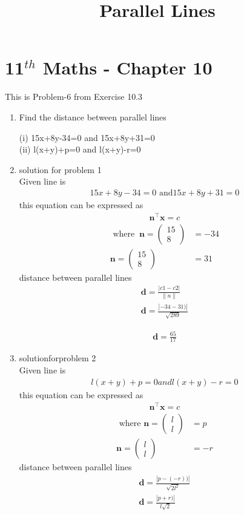 \documentclass[12pt]{article}
\providecommand{\norm}[1]{\left\lVert#1\right\rVert}
\newcommand{\myvec}[1]{\ensuremath{\begin{pmatrix}#1\end{pmatrix}}}
\let\vec\mathbf
\begin{document}
\begin{center}
\title{\textbf{Parallel Lines}}
\date{\vspace{-5ex}} %
\maketitle
\end{center}
\setcounter{page}{1}
\section*{11$^{th}$ Maths - Chapter 10}
This is Problem-6 from Exercise 10.3
\begin{enumerate}
	\item Find the distance between parallel lines 
	
(i) 15x+8y-34=0 and  15x+8y+31=0 \\
(ii) l(x+y)+p=0 and  l(x+y)-r=0
\	
\item solution for problem 1
\\
Given line is 
\begin{align}
	15x+8y-34=0 \text{ and} 15x+8y+31=0
\end{align}
this equation can be expressed as 
\begin{align}
	\vec{n}^{\top}\vec{x}=c	
\end{align}
\begin{align}
\text{ where }\
		\vec{n} = \myvec{15 \\8}&=-34\\
		\vec{n} = \myvec{15 \\8}&= 31
\end{align} 
distance between parallel lines 
\begin{align}
\vec{d}=\frac{\left|c1-c2\right|}{\norm{n}}\\
\vec{d}=\frac{\left|-34-31)\right|}{\sqrt{289}}
\end{align}
		
\begin{align}
	\vec{d}=\frac{65}{17}
\end{align}
	\item solutionforproblem 2
	\\
Given line is 
\begin{align}
	l(x+y)+p=0 and  l(x+y)-r=0
\end{align}
this equation can be expressed as 
\begin{align}
	\vec{n}^{\top}\vec{x}=c
\end{align}
\begin{align}
\text{ where }
		\vec{n} = \myvec{l\\l}&= p\\
		\vec{n} = \myvec{l\\l}&=-r
\end{align}
distance between parallel lines 
\begin{align}
\vec{d}=\frac{\left|p-(-r))\right|}{\sqrt{2l^{2}}}\\
\vec{d}=\frac{\left|p+r)\right|}{l\sqrt{2}}
\end{align}
		
\end{enumerate}
\end{document}
